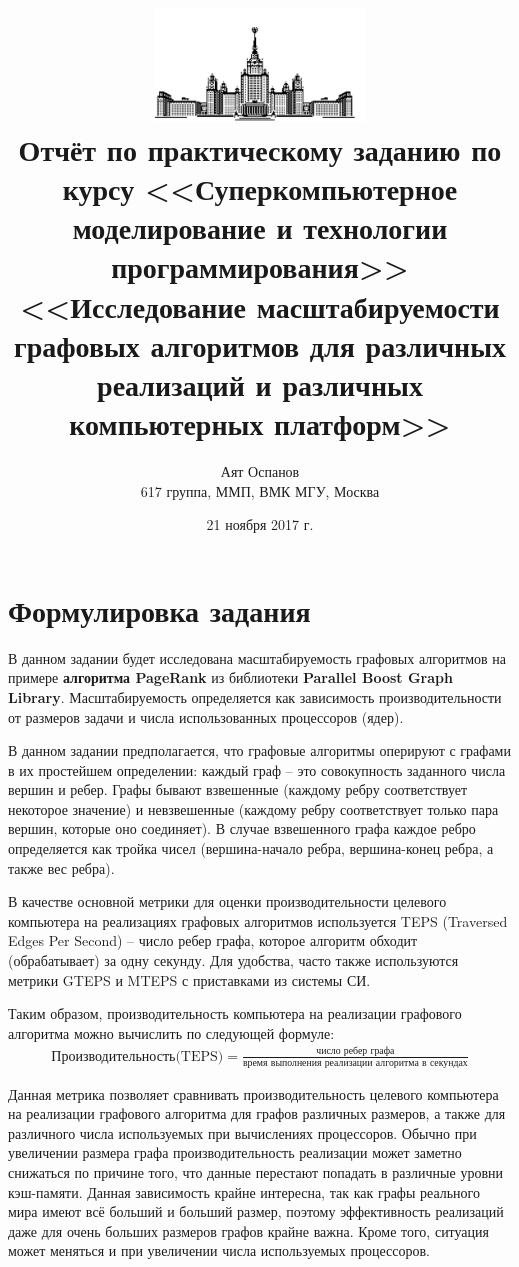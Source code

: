 \documentclass[12pt, a4paper]{article}
\title{
    \includegraphics[height=3cm]{pics/msu.png} \\
    \large{
        Отчёт по практическому заданию по курсу <<Суперкомпьютерное моделирование и технологии программирования>> \\
        \textbf{<<Исследование масштабируемости графовых алгоритмов для различных реализаций и различных компьютерных платформ>>}
    }
}
\author{
    \normalsize{Аят Оспанов} \\
    \normalsize{617 группа, ММП, ВМК МГУ, Москва}
}
\date{\normalsize{21 ноября 2017 г.}}
\begin{document}
    \maketitle
    \tableofcontents

    \section{Формулировка задания}
        В данном задании будет исследована масштабируемость графовых алгоритмов на примере \textbf{алгоритма PageRank} из библиотеки \textbf{Parallel Boost Graph Library}. Масштабируемость определяется как зависимость производительности от размеров задачи и числа использованных процессоров (ядер).

        В данном задании предполагается, что графовые алгоритмы оперируют с графами в их простейшем определении: каждый граф -- это совокупность заданного числа вершин и ребер. Графы бывают взвешенные (каждому ребру соответствует некоторое значение) и невзвешенные (каждому ребру соответствует только пара вершин, которые оно соединяет). В случае взвешенного графа каждое ребро определяется как тройка чисел (вершина-начало ребра, вершина-конец ребра, а также вес ребра).

        В качестве основной метрики для оценки производительности целевого компьютера на реализациях графовых алгоритмов используется TEPS (Traversed Edges Per Second) -- число ребер графа, которое алгоритм обходит (обрабатывает) за одну секунду. Для удобства, часто также используются метрики GTEPS и MTEPS с приставками из системы СИ.

        Таким образом, производительность компьютера на реализации графового алгоритма можно вычислить по следующей формуле:
        \begin{gather}
            \text{Производительность(TEPS)}=\frac{\text{число ребер графа}}{\text{время выполнения реализации алгоритма в секундах}}
            \label{eq:teps}
        \end{gather}

        Данная метрика позволяет сравнивать производительность целевого компьютера на реализации графового алгоритма для графов различных размеров, а также для различного числа используемых при вычислениях процессоров. Обычно при увеличении размера графа производительность реализации может заметно снижаться по причине того, что данные перестают попадать в различные уровни кэш-памяти. Данная зависимость крайне интересна, так как графы реального мира имеют всё больший и больший размер, поэтому эффективность реализаций даже для очень больших размеров графов крайне важна. Кроме того, ситуация может меняться и при увеличении числа используемых процессоров.
\end{document}
